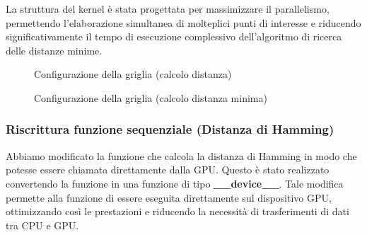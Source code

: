 \documentclass[12pt,a4paper]{report}
\begin{document}
La struttura del kernel è stata progettata per massimizzare il parallelismo, permettendo l'elaborazione simultanea di molteplici punti di interesse e riducendo significativamente il tempo di esecuzione complessivo dell'algoritmo di ricerca delle distanze minime.

\vspace{1cm}

\begin{figure}[h]
    \centering
    \caption{Configurazione della griglia (calcolo distanza) }
\end{figure}

\begin{figure}[h]
    \centering
    \caption{Configurazione della griglia (calcolo distanza minima) }
\end{figure}

\subsubsection{Riscrittura funzione sequenziale (Distanza di Hamming) }

Abbiamo modificato la funzione che calcola la distanza di Hamming in modo che potesse essere chiamata direttamente dalla GPU. Questo è stato realizzato convertendo la funzione in una funzione di tipo \textbf{\_\_device\_\_}. Tale modifica permette alla funzione di essere eseguita direttamente sul dispositivo GPU, ottimizzando così le prestazioni e riducendo la necessità di trasferimenti di dati tra CPU e GPU.
\end{document}
